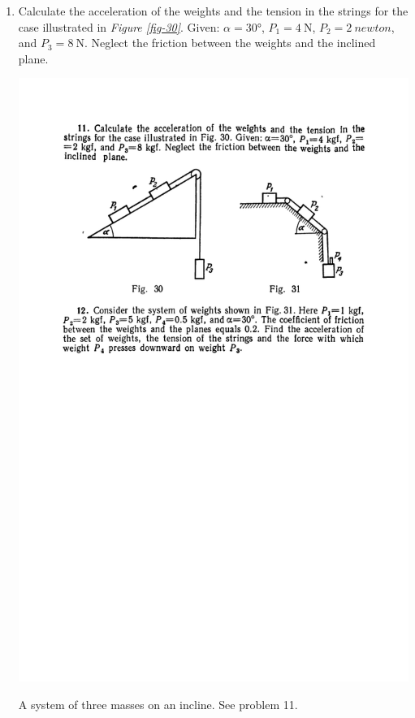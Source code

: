 \documentclass[a4paper,sfsidenotes]{tufte-book}
\begin{document}
\begin{enumerate}[resume*=problems]
\item Calculate the acceleration of the weights and the tension in the strings for the case illustrated in \emph{Figure \ref{fig-30}}. Given: $\alpha = \ang{30}$, $P_{1}=\SI{4}{\newton}$, $P_{2}=\SI{2}{newton}$, and $P_{3}=\SI{8}{\newton}$. Neglect the friction between the weights and the inclined plane.
\begin{marginfigure}
\centering
\includegraphics[width=0.8\linewidth]{fig-030a.pdf}
\caption{A system of three masses on an incline. See problem 11.}
\label{fig-30}
\end{marginfigure}


\end{enumerate}
\end{document}

